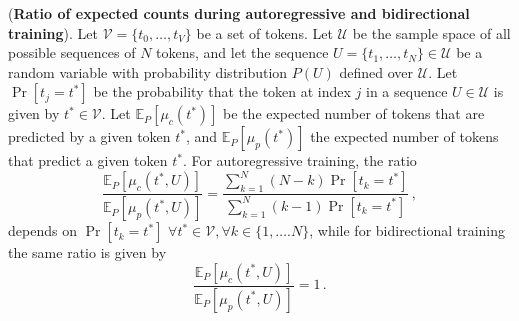 \begin{proposition}
\label{prop-counting-prediction-context}
%
(\textbf{Ratio of expected counts during autoregressive and bidirectional training}).
%
Let $\mathcal{V} = \{t_0, \dots, t_V\}$ be a set of tokens.
%
Let $\mathcal{U}$ be the sample space of all possible sequences of $N$ tokens, and let the sequence $U = \{t_1, \dots, t_N\} \in\mathcal{U}$ be a random variable with probability distribution $P(U)$ defined over $\mathcal{U}$.
%
Let $\Pr[t_j = t^*]$ be the probability that the token at index $j$ in a sequence $U \in \mathcal{U}$ is given by $t^* \in \mathcal{V}$.
%
Let $\mathbb{E}_{P}[\mu_c(t^*)]$ be the expected number of tokens that are predicted by a given token $t^*$, and $\mathbb{E}_{P}[\mu_p(t^*)]$ the expected number of tokens that predict a given token $t^*$.
%
For autoregressive training, the ratio
%
\begin{equation}
    \frac{\mathbb{E}_{P}[\mu_c(t^*, U)]}{\mathbb{E}_{P}[\mu_p(t^*, U)]} = \frac{\sum_{k=1}^N (N-k)\Pr[t_k = t^*]}{\sum_{k=1}^N(k-1)\Pr[t_k = t^*]} \,,
\end{equation}
%
depends on $\Pr[t_k = t^*] \,\,\forall t^* \in \mathcal{V}, \forall k \in \{1,\dots. N\}$, while for bidirectional training the same ratio is given by 
%
\begin{equation}
     \frac{\mathbb{E}_{P}[\mu_c(t^*, U)]}{\mathbb{E}_{P}[\mu_p(t^*, U)]} = 1 \,.
\end{equation}
%    
\end{proposition}





